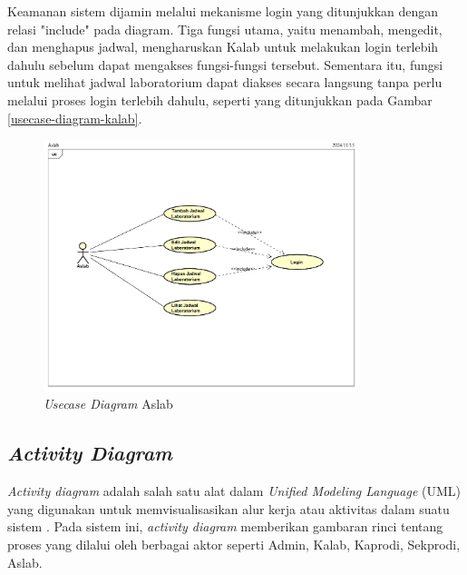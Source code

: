 Keamanan sistem dijamin melalui mekanisme login yang ditunjukkan dengan relasi "include" pada diagram. Tiga fungsi utama, yaitu menambah, mengedit, dan menghapus jadwal, mengharuskan Kalab untuk melakukan login terlebih dahulu sebelum dapat mengakses fungsi-fungsi tersebut. Sementara itu, fungsi untuk melihat jadwal laboratorium dapat diakses secara langsung tanpa perlu melalui proses login terlebih dahulu, seperti yang ditunjukkan pada Gambar \ref{usecase-diagram-kalab}.
\begin{figure}
	\centering
	\includegraphics[width=0.82\textwidth]{konten/gambar/usecase-diagram/aslab.png}
	\caption{\textit{Usecase Diagram} Aslab}
	\label{usecase-diagram-aslab}
\end{figure}

\subsection{\textit{Activity Diagram}}
\textit{Activity diagram} adalah salah satu alat dalam \textit{Unified Modeling Language} (UML) yang digunakan untuk memvisualisasikan alur kerja atau aktivitas dalam suatu sistem \cite{linzhang2004generating}. Pada sistem ini, \textit{activity diagram} memberikan gambaran rinci tentang proses yang dilalui oleh berbagai aktor seperti Admin, Kalab, Kaprodi, Sekprodi, Aslab.

